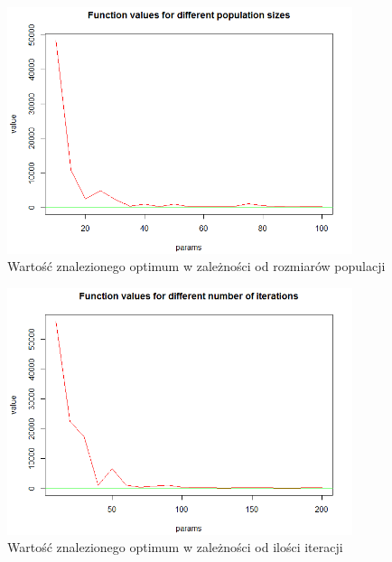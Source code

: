 \documentclass[11pt, a4paper]{article}
\begin{document}
\begin{figure}[H]
	\begin{center}
		\includegraphics[width=0.9\textwidth]{./assets/PriceTransistor5.png} %
		\caption{Wartość znalezionego optimum w zależności od rozmiarów populacji}
		\label{fig:pricetransistor5}
	\end{center}
\end{figure}

\begin{figure}[H]
	\begin{center}
		\includegraphics[width=0.9\textwidth]{./assets/PriceTransistor6.png} %
		\caption{Wartość znalezionego optimum w zależności od ilości iteracji}
		\label{fig:pricetransistor6}
	\end{center}
\end{figure}
\end{document}
